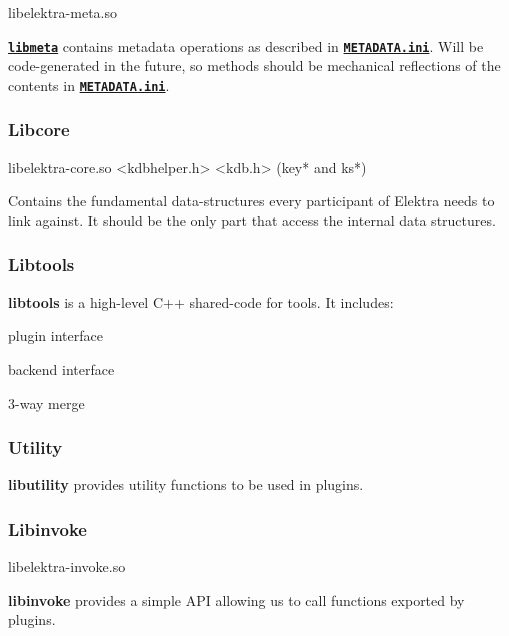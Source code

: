 \begin{DoxyVerb}libelektra-meta.so
\end{DoxyVerb}


{\bfseries \href{/home/markus/Projekte/Elektra/current/src/libs/meta/meta.c}{\tt libmeta}} contains metadata operations as described in {\bfseries \href{/home/markus/Projekte/Elektra/current/doc/METADATA.ini}{\tt M\+E\+T\+A\+D\+A\+T\+A.\+ini}}. Will be code-\/generated in the future, so methods should be mechanical reflections of the contents in {\bfseries \href{/home/markus/Projekte/Elektra/current/doc/METADATA.ini}{\tt M\+E\+T\+A\+D\+A\+T\+A.\+ini}}.

\subsubsection*{Libcore}

\begin{DoxyVerb}libelektra-core.so
<kdbhelper.h>
<kdb.h> (key* and ks*)
\end{DoxyVerb}


Contains the fundamental data-\/structures every participant of Elektra needs to link against. It should be the only part that access the internal data structures.

\subsubsection*{Libtools}

{\bfseries libtools} is a high-\/level C++ shared-\/code for tools. It includes\+:


\begin{DoxyItemize}
\item plugin interface
\item backend interface
\item 3-\/way merge
\end{DoxyItemize}

\subsubsection*{Utility}

{\bfseries libutility} provides utility functions to be used in plugins.

\subsubsection*{Libinvoke}

\begin{DoxyVerb}libelektra-invoke.so
\end{DoxyVerb}


{\bfseries libinvoke} provides a simple A\+PI allowing us to call functions exported by plugins. 